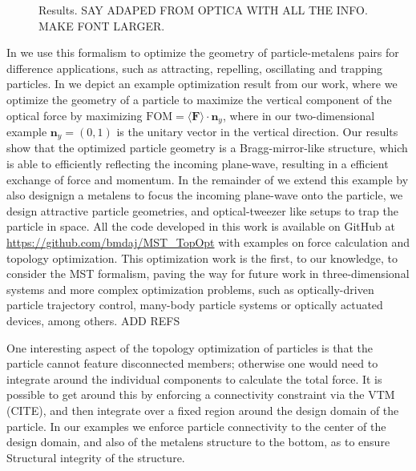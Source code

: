 \begin{figure}[tb]
    \centering
    \caption{Results. SAY ADAPED FROM OPTICA WITH ALL THE INFO. MAKE FONT LARGER.}
    \label{fig:eng_res}
\end{figure}

In \cite{ownpub3} we use this formalism to optimize the geometry of particle-metalens pairs for difference applications, such as attracting, repelling, 
oscillating and trapping particles. In  we depict an example optimization result from our work, where 
we optimize the geometry of a particle to maximize the vertical component of the optical force by maximizing $\text{FOM} = \langle\mathbf{F}\rangle \cdot \mathbf{n}_y$, where
in our two-dimensional example $\mathbf{n}_y = (0, 1)$ is the unitary vector in the vertical direction. Our results show that the optimized particle geometry is a Bragg-mirror-like
structure, which is able to efficiently reflecting the incoming plane-wave, resulting in a efficient exchange of force and momentum. In the remainder of \cite{ownpub3} we extend this example by also designign a metalens to focus the incoming plane-wave onto the particle,
we design attractive particle geometries, and optical-tweezer like setups to trap the particle in space. All the code developed in this work is available on GitHub
at \url{https://github.com/bmdaj/MST_TopOpt} with examples on force calculation and topology optimization. This optimization work is the first, to our knowledge, to 
consider the MST formalism, paving the way for future work in three-dimensional systems and more complex optimization problems, such as optically-driven particle
trajectory control, many-body particle systems or optically actuated devices, among others. ADD REFS

One interesting aspect of the topology optimization of particles is that the particle cannot feature disconnected members; otherwise
one would need to integrate around the individual components to calculate the total force. It is possible to get around this by enforcing 
a connectivity constraint via the VTM (CITE), and then integrate over a fixed region around the design domain of the particle. In our examples
we enforce particle connectivity to the center of the design domain, and also of the metalens structure to the bottom, as to ensure Structural
integrity of the structure.

